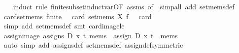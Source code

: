 \begin{isabellebody}
%
\isadelimproof
\ \ %
\endisadelimproof
%
\isatagproof
{}\isamarkupfalse%
\ {}induct\ rule{}\ finite{}subset{}induct{}var{}OF\ assms{}{}{}{}\ of\ {}{}{}{}{}\ simp{}all\ add{}\ set{}mems{}def{}%
\endisatagproof
{\isafoldproof}%
%
\isadelimproof
\isanewline
%
\endisadelimproof
\isanewline
{}\isamarkupfalse%
\ card{}set{}mems{}\ {}finite\ {}\ {}\ card\ {}set{}mems\ X\ f\ {}{}\ {}\ card\ {}{}\isanewline
%
\isadelimproof
\ \ %
\endisadelimproof
%
\isatagproof
{}\isamarkupfalse%
\ {}simp\ add{}\ set{}mems{}def{}\ smt\ card{}image{}le{}%
\endisatagproof
{\isafoldproof}%
%
\isadelimproof
\isanewline
%
\endisadelimproof
\isanewline
{}\isamarkupfalse%
\ assign{}image{}\ {}assigns\ D\ x\ t\ mems\ {}\ assign\ D\ x\ t\ {}\ mems{}\isanewline
%
\isadelimproof
\ \ %
\endisadelimproof
%
\isatagproof
{}\isamarkupfalse%
\ {}auto\ simp\ add{}\ assigns{}def\ set{}mems{}def\ assign{}def{}symmetric{}{}%

\end{isabellebody}
